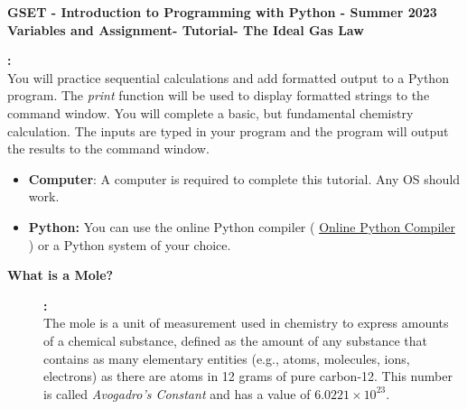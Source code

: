 \documentclass[12pt]{article}
\newcommand{\MNUM}{3} %
\newcommand{\MNAME}{Variables and Assignment} %
\newcommand{\TNAME}{The Ideal Gas Law} %
\begin{document}
\thispagestyle{plain}

\begin{center}
   {\bf \large GSET - Introduction to Programming with Python - Summer 2023} \vspace{5mm}\\
   {\bf \Large \MNAME \hspc -  Tutorial\hspc\MNUM\hspc - \TNAME}\vspace{3mm}\\
   
\end{center}


\begin{description}[labelindent=1cm]
	
			\item [\textbf{ \Large Overview}] \textbf{ \Large :}\\
			You will practice sequential calculations and add formatted output to a Python program. The {\it print} function will be used to display formatted strings to the command window. You will complete a basic, but fundamental chemistry calculation. The inputs are typed in your program and the program will output the results to the command window. \\
 	
	\item[\textbf{\underline{System Requirements:}}] \hfill \vspace{0mm}

\begin{itemize}
	\item {\bf Computer}: A computer is required to complete this tutorial. Any OS should work.
	\item {\bf Python:} You can use the online Python compiler ( \href{https://www.online-python.com/online_python_compiler}{Online Python Compiler}  ) or a Python system of your choice.
\end{itemize}

	\item[\textbf{\underline{Background:}}] \hfill \vspace{0mm}
	
	\begin{description}

	 	\item [\textbf{ What is a Mole?}] \textbf{ \Large :}\\   
            The mole is a unit of measurement used in chemistry to express amounts of a chemical substance, defined as the amount of any substance that contains as many elementary entities (e.g., atoms, molecules, ions, electrons) as there are atoms in 12 grams of pure carbon-12. This number is called {\it Avogadro's Constant} and has a value of $6.0221\times10^{23}$. \\
            

\end{description}
\end{description}
\end{document}
